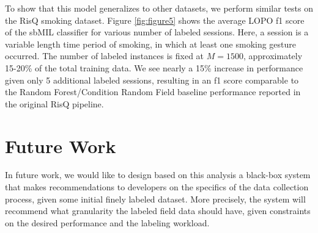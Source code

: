 \documentclass{sigchi}
\begin{document}
To show that this model generalizes to other datasets, we perform similar tests on the RisQ smoking dataset. Figure \ref{fig:figure5} shows the average LOPO f1 score of the sbMIL classifier for various number of labeled sessions. Here, a session is a variable length time period of smoking, in which at least one smoking gesture occurred. The number of labeled instances is fixed at $M = 1500$, approximately 15-20\% of the total training data. We see nearly a 15\% increase in performance given only 5 additional labeled sessions, resulting in an f1 score comparable to the Random Forest/Condition Random Field baseline performance reported in the original RisQ pipeline.




\section{Future Work}

In future work, we would like to design based on this analysis a black-box system that makes recommendations to developers on the specifics of the data collection process, given some initial finely labeled dataset. More precisely, the system will recommend what granularity the labeled field data should have, given constraints on the desired performance and the labeling workload.
\end{document}
